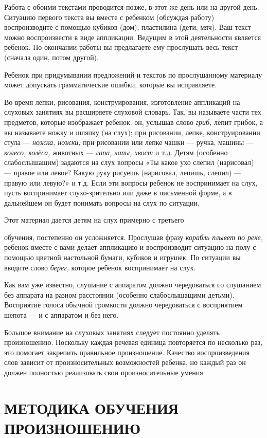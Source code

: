 \documentclass{book}
\renewcommand{\emph}[1]{\textit{#1}}
\begin{document}
Работа с обоими текстами проводится позже, в этот же день или на другой
день. Ситуацию первого текста вы вместе с ребенком (обсуждая работу)
воспроизводите с помощью кубиков (дом), пластилина (дети, мяч). Ваш
текст можно воспроизвести в виде аппликации. Ведущим в этой деятельности
является ребенок. По окончании работы вы предлагаете ему прослушать весь
текст (сначала один, потом другой).

Ребенок при придумывании предложений и текстов по прослушанному
материалу может допускать грамматические ошибки, которые вы исправляете.

Во время лепки, рисования, конструирования, изготовление аппликаций на
слуховых занятиях вы расширяете слуховой словарь. Так, вы называете
части тех предметов, которые изображает ребенок: он, услышав слово
\emph{гриб,} лепит грибок, а вы называете ножку и шляпку (на слух); при
рисовании, лепке, конструировании стула --- \emph{ножка, ножки;} при
рисовании или лепке чашки --- ручка, машины --- \emph{колесо, колёса,}
животных --- \emph{лапа, лапы, хвост} и т.д. Детям (особенно
слабослышащим) задаются на слух вопросы «Ты какое ухо слепил (нарисовал)
--- правое или левое? Какую руку рисуешь (нарисовал, лепишь, слепил) ---
правую или левую?» и т.д. Если эти вопросы ребенок не воспринимает на
слух, пусть воспринимает слухо-зрительно или даже в письменной форме, а
в дальнейшем он будет понимать вопросы на слух по ситуации.

Этот материал дается детям на слух примерно с третьего

обучения, постепенно он усложняется. Прослушав фразу \emph{корабль
плывет по реке,} ребенок вместе с вами делает аппликацию и воспроизводит
ситуацию на полу с помощью цветной настольной бумаги, кубиков и игрушек.
По ситуации вы вводите слово \emph{берег,} которое ребенок воспринимает
на слух.

Как вам уже известно, слушание с аппаратом должно чередоваться со
слушанием без аппарата на разном расстоянии (особенно слабослышащими
детьми). Восприятие голоса обычной громкости должно чередоваться с
восприятием шепота --- и с аппаратом и без него.

Большое внимание на слуховых занятиях следует постоянно уделять
произношению. Поскольку каждая речевая единица повторяется по несколько
раз, это помогает закрепить правильное произношение. Качество
воспроизведения слов зависит от произносительных возможностей ребенка,
но каждый раз он должен полностью реализовать свои произносительные
умения.

\section{МЕТОДИКА ОБУЧЕНИЯ ПРОИЗНОШЕНИЮ}
\end{document}
